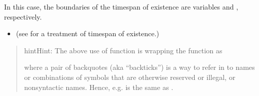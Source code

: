 \documentclass[a4paper,12pt,english]{sphinxhowto}
\begin{document}

In this case, the boundaries of the timespan of existence are variables  and ,
respectively.

\begin{itemize}
\item {} 
(see {\hyperref[\detokenize{Uncertainty:aora}]{}} for a treatment of timespan of existence.)

\end{itemize}

\label{\detokenize{EDHVariables:recursively-apply}}\begin{quote}

\begin{sphinxadmonition}{hint}{Hint:}
The above use of function  is wrapping the   function as

\begin{sphinxVerbatim}[commandchars=\\\{\},formatcom=\footnotesize]
  \PYG{n}{`[`}   
\end{sphinxVerbatim}

where a pair of backquotes (aka “backticks”) is a way to refer in  to names or combinations
of symbols that are otherwise reserved or illegal, or non\sphinxhyphen{}syntactic names.
Hence, e.g. \sphinxcode{\sphinxupquote{apply(foo, \textasciigrave{}{[}\textasciigrave{}, c(...) )}} is the same as .
\end{sphinxadmonition}
\end{quote}
\end{document}
